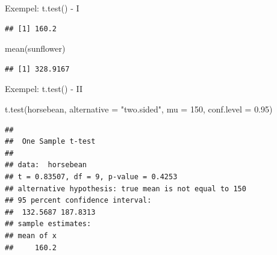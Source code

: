 \documentclass[
  11pt,
  ignorenonframetext,
  handout]{beamer}
\newenvironment{Shaded}{\begin{snugshade}}{\end{snugshade}}
\newcommand{\AttributeTok}[1]{\textcolor[rgb]{0.77,0.63,0.00}{#1}}
\newcommand{\DecValTok}[1]{\textcolor[rgb]{0.00,0.00,0.81}{#1}}
\newcommand{\FloatTok}[1]{\textcolor[rgb]{0.00,0.00,0.81}{#1}}
\newcommand{\FunctionTok}[1]{\textcolor[rgb]{0.00,0.00,0.00}{#1}}
\newcommand{\NormalTok}[1]{#1}
\newcommand{\OtherTok}[1]{\textcolor[rgb]{0.56,0.35,0.01}{#1}}
\newcommand{\SpecialCharTok}[1]{\textcolor[rgb]{0.00,0.00,0.00}{#1}}
\newcommand{\StringTok}[1]{\textcolor[rgb]{0.31,0.60,0.02}{#1}}
\begin{document}
\begin{frame}[fragile]{Exempel: t.test() - I}
\protect\hypertarget{exempel-t.test---i}{}
\begin{Shaded}
\end{Shaded}

\begin{verbatim}
## [1] 160.2
\end{verbatim}

\begin{Shaded}
\begin{Highlighting}[]
\FunctionTok{mean}\NormalTok{(sunflower)}
\end{Highlighting}
\end{Shaded}

\begin{verbatim}
## [1] 328.9167
\end{verbatim}
\end{frame}

\begin{frame}[fragile]{Exempel: t.test() - II}
\protect\hypertarget{exempel-t.test---ii}{}
\begin{Shaded}
\begin{Highlighting}[]
\FunctionTok{t.test}\NormalTok{(horsebean, }\AttributeTok{alternative =} \StringTok{"two.sided"}\NormalTok{,}
       \AttributeTok{mu =} \DecValTok{150}\NormalTok{, }\AttributeTok{conf.level =} \FloatTok{0.95}\NormalTok{)}
\end{Highlighting}
\end{Shaded}

\begin{verbatim}
## 
##  One Sample t-test
## 
## data:  horsebean
## t = 0.83507, df = 9, p-value = 0.4253
## alternative hypothesis: true mean is not equal to 150
## 95 percent confidence interval:
##  132.5687 187.8313
## sample estimates:
## mean of x 
##     160.2
\end{verbatim}
\end{frame}
\end{document}

